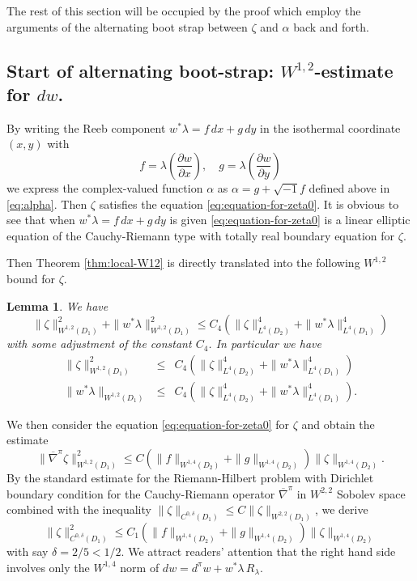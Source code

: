 \documentclass[reqno]{amsart}
\newcommand{\del}{\partial}
\newcommand{\bea}{\begin{eqnarray}}
\newcommand{\eea}{\end{eqnarray}}
\theoremstyle{theorem}
\newtheorem{lem}[thm]{Lemma}
\theoremstyle{definition}
\numberwithin{equation}{section}
\begin{document}
The rest of this section will be occupied by the proof which
employ the arguments of the alternating boot strap between $\zeta$ and $\alpha$
back and forth.

\subsection{Start of alternating boot-strap: $W^{1,2}$-estimate for $dw$.}

By writing the Reeb component $w^*\lambda = f \, dx + g\, dy$
in the isothermal coordinate $(x,y)$ with
$$
f = \lambda \left(\frac{\del w}{\del x}\right) , \quad g = \lambda \left(\frac{\del w}{\del y}\right)
$$
we express the complex-valued function $\alpha$ as
$\alpha = g + \sqrt{-1}f$ defined above in \eqref{eq:alpha}. Then
$\zeta$ satisfies the equation \eqref{eq:equation-for-zeta0}.
It is obvious to see that when $w^*\lambda = f \, dx + g\, dy$ is given
\eqref{eq:equation-for-zeta0} is a
linear elliptic equation of the Cauchy-Riemann type
with totally real boundary equation for $\zeta$.

Then Theorem  \ref{thm:local-W12} is directly translated into the following
$W^{1,2}$ bound for $\zeta$.

\begin{lem}\label{lem:W12-zeta} We have
$$
\|\zeta\|_{W^{1,2}(D_1)}^2 + \|w^*\lambda\|_{W^{1,2}(D_1)}^2
 \leq  C_4 (\|\zeta\|_{L^4(D_2)} ^4+ \|w^*\lambda\|_{L^4(D_1)}^4)
 $$
 with some adjustment of the constant $C_4$.
 In particular we have
 \bea
 \|\zeta\|_{W^{1,2}(D_1)}^2
&  \leq  & C_4 (\|\zeta\|_{L^4(D_2)}^4 + \|w^*\lambda\|_{L^4(D_1)}^4)\\
 \|w^*\lambda\|_{W^{1,2}(D_1)} \label{eq:W22-zeta}
&  \leq  & C_4 (\|\zeta\|_{L^4(D_2)}^4 + \|w^*\lambda\|_{L^4(D_1)}^4).
\label{eq:W22-fg}
 \eea
\end{lem}

We then consider the equation \eqref{eq:equation-for-zeta0} for $\zeta$ and
 obtain the estimate
$$
\|\overline \nabla^\pi \zeta\|_{W^{1,2}(D_1)}^2 \leq C (\|f\|_{W^{1,4}(D_2)}
+ \|g\|_{W^{1,4}(D_2)})\|\zeta\|_{W^{1,4}(D_2)}.
$$
By the standard estimate for the Riemann-Hilbert problem
with Dirichlet boundary condition for the Cauchy-Riemann operator
$\overline \nabla^\pi$ in $W^{2,2}$ Sobolev space combined with the inequality
$\|\zeta\|_{C^{0,\delta}(D_1)} \leq C \|\zeta\|_{W^{2,2}(D_1)}$, we derive
$$
\|\zeta\|_{C^{0,\delta}(D_1)}^2 \leq C_1(\|f\|_{W^{1,4}(D_2)} + \|g\|_{W^{1,4}(D_2)})
\|\zeta\|_{W^{1,4}(D_2)}
$$
with say $\delta = 2/5 < 1/2$. We attract readers' attention that the right hand side
involves only the $W^{1,4}$ norm of $dw = d^\pi w + w^*\lambda\, R_\lambda$.
\end{document}
